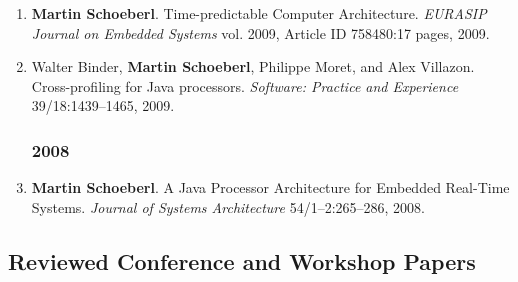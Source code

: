 \begin{enumerate}
\item {\bf Martin Schoeberl}.
 Time-predictable Computer Architecture.
 \emph{EURASIP Journal on Embedded Systems} vol. 2009, Article ID 758480:17 pages, 2009.

\item Walter Binder, {\bf Martin Schoeberl}, Philippe Moret, and Alex Villazon.
 Cross-profiling for Java processors.
 \emph{Software: Practice and Experience} 39/18:1439--1465, 2009.


\subsubsection*{2008}

\item {\bf Martin Schoeberl}.
 A Java Processor Architecture for Embedded Real-Time Systems.
 \emph{Journal of Systems Architecture} 54/1--2:265--286, 2008.


\end{enumerate}

\subsection*{Reviewed Conference and Workshop Papers}

